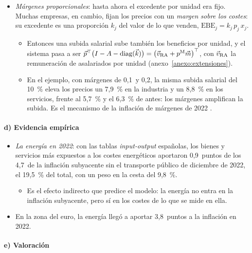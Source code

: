 \documentclass[11pt]{article}
\begin{document}
\begin{itemize}
\item \emph{Márgenes proporcionales}: hasta ahora el excedente por unidad era fijo. Muchas empresas, en cambio, fijan los precios con un \emph{margen sobre los costes}: su excedente es una proporción $k_j$ del valor de lo que venden, $\mathrm{EBE}_j=k_j\,p_j\,x_j$.
  \begin{itemize}
  \item Entonces una subida salarial sube también los beneficios por unidad, y el sistema pasa a ser $\vec{p}^{\top}\bigl(I-A-\operatorname{diag}(\vec{k})\bigr)=\bigl(\vec{v}_{\mathrm{RA}}+p^{\mathrm M}\vec{m}\bigr)^{\top}$, con $\vec{v}_{\mathrm{RA}}$ la remuneración de asalariados por unidad (anexo~\ref{anexo:extensiones}).
  \item En el ejemplo, con márgenes de 0,1~y 0,2, la misma subida salarial del 10~\% eleva los precios un 7,9~\% en la industria y un 8,8~\% en los servicios, frente al 5,7~\% y el 6,3~\% de antes: los márgenes amplifican la subida. Es el mecanismo de la inflación de márgenes de 2022 .
  \end{itemize}
\end{itemize}

\paragraph{d) Evidencia empírica}

\begin{itemize}
\item \emph{La energía en 2022}: con las tablas \emph{input-output} españolas, los bienes y servicios más expuestos a los costes energéticos aportaron 0,9~puntos de los 4,7~de la inflación subyacente sin el transporte público de diciembre de 2022, el 19,5~\% del total, con un peso en la cesta del 9,8~\%\nocite{IbanezdeAldecoa2023}.
  \begin{itemize}
  \item Es el efecto indirecto que predice el modelo: la energía no entra en la inflación subyacente, pero sí en los costes de lo que se mide en ella.
  \end{itemize}
\item En la zona del euro, la energía llegó a aportar 3,8~puntos a la inflación en 2022\nocite{ArceEtAl2024What}.
\end{itemize}

\paragraph{e) Valoración}
\end{document}

